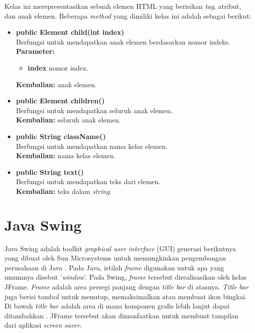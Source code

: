 Kelas ini merepresentasikan sebuah elemen HTML yang berisikan \textit{tag}, atribut, dan anak elemen. Beberapa \textit{method} yang dimiliki kelas ini adalah sebagai berikut:
\begin{itemize}
	\item \textbf{public Element child(int index)} \\
		Berfungsi untuk mendapatkan anak elemen berdasarkan nomor indeks. \\
		\textbf{Parameter:} 
		\begin{itemize}
			\item \textbf{index} nomor index.
		\end{itemize}
		\textbf{Kembalian:} anak elemen.	
		
		\item \textbf{public Element children()} \\
		Berfungsi untuk mendapatkan seluruh anak elemen. \\
		\textbf{Kembalian:} seluruh anak elemen.	
		
		\item \textbf{public String className()} \\
		Berfungsi untuk mendapatkan nama kelas elemen. \\
		\textbf{Kembalian:} nama kelas elemen.	
		
		\item \textbf{public String text()} \\
		Berfungsi untuk mendapatkan teks dari elemen. \\
		\textbf{Kembalian:} teks dalam \textit{string}.	
\end{itemize}

\section{Java Swing}
\label{sec:javaswing}

Java Swing adalah toolkit \textit{graphical user interface} (GUI) generasi berikutnya yang dibuat oleh Sun Microsystems untuk memungkinkan pengembangan perusahaan di Java \cite{loy}. Pada Java, istilah \textit{frame} digunakan untuk apa yang umumnya disebut '\textit{window}'. Pada Swing, \textit{frame} tersebut direalisasikan oleh kelas JFrame. \textit{Frame} adalah area persegi panjang dengan \textit{title bar} di atasnya. \textit{Title bar} juga berisi tombol untuk menutup, memaksimalkan atau membuat ikon bingkai. Di bawah \textit{title bar} adalah area di mana komponen grafis lebih lanjut dapat ditambahkan \cite{fischer}. JFrame tersebut akan dimanfaatkan untuk membuat tampilan dari aplikasi \textit{screen saver}. 


